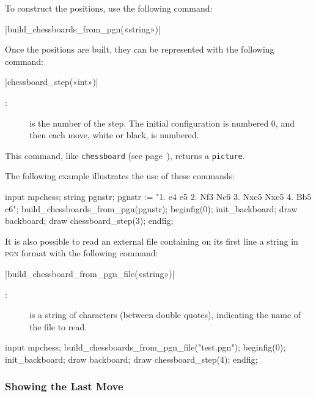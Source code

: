 \documentclass[english]{ltxdoc}
\begin{document}
To construct the positions, use the following command:

\commande|build_chessboards_from_pgn(«string»)|\smallskip


Once the positions are built, they can be represented with the following command:

\commande|chessboard_step(«int»)|\smallskip
\begin{description}
\item[:] is the number of the step. The initial configuration is numbered 0, and then each move, white or black, is numbered.
\end{description}

This command, like \lstinline+chessboard+ (see page~\pageref{com:chessboard}),
returns a \lstinline+picture+. 

The following example illustrates the use of these commands:

\begin{ExempleMP}
input mpchess;
string pgnstr;
pgnstr := "1. e4 e5 2. Nf3 Nc6 3. Nxe5 Nxe5 4. Bb5 c6";
build_chessboards_from_pgn(pgnstr);
beginfig(0);
init_backboard;
draw backboard;
draw chessboard_step(3); %
endfig;
\end{ExempleMP}


It is also possible to read an external file containing on its first line a
string in  \textsc{pgn} format with the following command:

\commande|build_chessboard_from_pgn_file(«string»)|\smallskip

\begin{description}
  \item[:] is a string of characters (between double quotes),
  indicating the name of the file to read.  
\end{description}

\begin{ExempleMP}
input mpchess;
build_chessboards_from_pgn_file("test.pgn");
beginfig(0);
init_backboard;
draw backboard;
draw chessboard_step(4); %
endfig;
\end{ExempleMP}

\subsubsection{Showing the Last Move}
\end{document}
